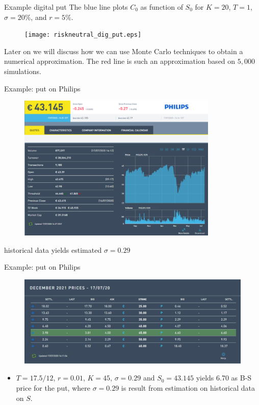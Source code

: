 \documentclass[pdf, handout]{beamer}
\begin{document}
%
\begin{frame}{Example digital put}
The blue line plots $C_0$ as function of $S_0$ for $K=20$, $T=1$, $\sigma=20\% $, and $r=5\%$. 
\begin{figure}
\texttt{[image: riskneutral\_dig\_put.eps]}
\end{figure}
Later on we will discuss how we can use Monte Carlo techniques to obtain a numerical approximation. The red line is such an approximation based on 
$5,000$ simulations.
\end{frame}

\begin{frame}{Example: put on Philips}
\vspace{-.7cm}
\begin{figure}
\includegraphics[width=0.85\textwidth]{philips.png}
\end{figure}
historical data yields estimated $\sigma=0.29$
\end{frame}

\begin{frame}{Example: put on Philips}
\vspace{.7cm}
\begin{figure}
\includegraphics[width=\textwidth]{philips2.png}
\end{figure}
\begin{itemize}
\item
$T=17.5/12$, $r=0.01$, $K=45$, $\sigma=0.29$ and $S_0=43.145$ yields 6.70 as B-S price for the put,
where $\sigma=0.29$ is result from estimation on historical data on $S$.
\end{itemize}
\end{frame}
\end{document}
